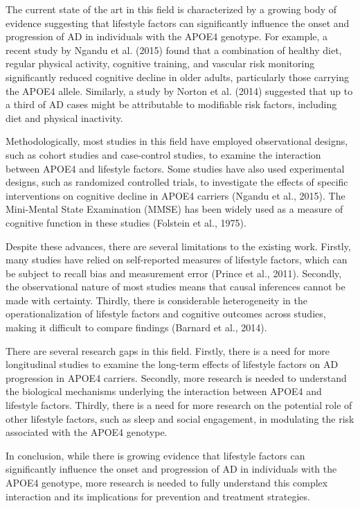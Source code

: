 \documentclass[conference]{IEEEtran}
\begin{document}
The current state of the art in this field is characterized by a growing body of evidence suggesting that lifestyle factors can significantly influence the onset and progression of AD in individuals with the APOE4 genotype. For example, a recent study by Ngandu et al. (2015) found that a combination of healthy diet, regular physical activity, cognitive training, and vascular risk monitoring significantly reduced cognitive decline in older adults, particularly those carrying the APOE4 allele. Similarly, a study by Norton et al. (2014) suggested that up to a third of AD cases might be attributable to modifiable risk factors, including diet and physical inactivity.

Methodologically, most studies in this field have employed observational designs, such as cohort studies and case-control studies, to examine the interaction between APOE4 and lifestyle factors. Some studies have also used experimental designs, such as randomized controlled trials, to investigate the effects of specific interventions on cognitive decline in APOE4 carriers (Ngandu et al., 2015). The Mini-Mental State Examination (MMSE) has been widely used as a measure of cognitive function in these studies (Folstein et al., 1975).

Despite these advances, there are several limitations to the existing work. Firstly, many studies have relied on self-reported measures of lifestyle factors, which can be subject to recall bias and measurement error (Prince et al., 2011). Secondly, the observational nature of most studies means that causal inferences cannot be made with certainty. Thirdly, there is considerable heterogeneity in the operationalization of lifestyle factors and cognitive outcomes across studies, making it difficult to compare findings (Barnard et al., 2014).

There are several research gaps in this field. Firstly, there is a need for more longitudinal studies to examine the long-term effects of lifestyle factors on AD progression in APOE4 carriers. Secondly, more research is needed to understand the biological mechanisms underlying the interaction between APOE4 and lifestyle factors. Thirdly, there is a need for more research on the potential role of other lifestyle factors, such as sleep and social engagement, in modulating the risk associated with the APOE4 genotype.

In conclusion, while there is growing evidence that lifestyle factors can significantly influence the onset and progression of AD in individuals with the APOE4 genotype, more research is needed to fully understand this complex interaction and its implications for prevention and treatment strategies.
\end{document}
